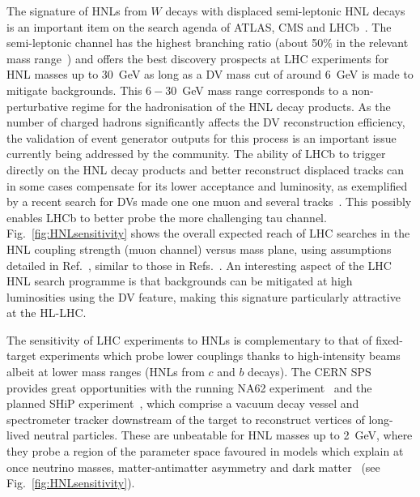 The signature of HNLs from $W$ decays with displaced semi-leptonic HNL decays is an important item on the search agenda of ATLAS, CMS and LHCb~\cite{Helo2014,Izaguirre2015,Mermod2017,Antusch2017}. The semi-leptonic channel has the highest branching ratio (about 50\% in the relevant mass range~\cite{Gronau1984}) and offers the best discovery prospects at LHC experiments for HNL masses up to 30~GeV as long as a DV mass cut of around 6~GeV is made to mitigate backgrounds. This $6-30$~GeV mass range corresponds to a non-perturbative regime for the hadronisation of the HNL decay products. As the number of charged hadrons significantly affects the DV reconstruction efficiency, the validation of event generator outputs for this process is an important issue currently being addressed by the community. The ability of LHCb to trigger directly on the HNL decay products and better reconstruct displaced tracks can in some cases compensate for its lower acceptance and luminosity, as exemplified by a recent search for DVs made one one muon and several tracks~\cite{LHCb2017,Antusch2017}. This possibly enables LHCb to better probe the more challenging tau channel. Fig.~\ref{fig:HNLsensitivity} shows the overall expected reach of LHC searches in the HNL coupling strength (muon channel) versus mass plane, using assumptions detailed in Ref.~\cite{Mermod2017}, similar to those in Refs.~\cite{Helo2014,Izaguirre2015}. An interesting aspect of the LHC HNL search programme is that backgrounds can be mitigated at high luminosities using the DV feature, making this signature particularly attractive at the HL-LHC.

The sensitivity of LHC experiments to HNLs is complementary to that of fixed-target experiments which probe lower couplings thanks to high-intensity beams albeit at lower mass ranges (HNLs from $c$ and $b$ decays). The CERN SPS provides great opportunities with the running NA62 experiment~\cite{NA622017a} and the planned SHiP experiment~\cite{SHiP2015}, which comprise a vacuum decay vessel and spectrometer tracker downstream of the target to reconstruct vertices of long-lived neutral particles. These are unbeatable for HNL masses up to 2~GeV, where they probe a region of the parameter space favoured in models which explain at once neutrino masses, matter-antimatter asymmetry and dark matter~\cite{Asaka2005b,Canetti2013b,Mermod2017b} (see Fig.~\ref{fig:HNLsensitivity}).

